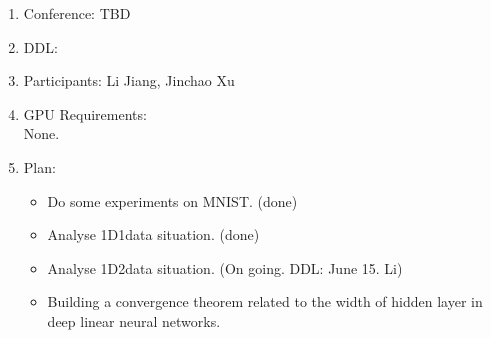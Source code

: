 \begin{enumerate}
    \item Conference: TBD
    \item DDL: 
	\item Participants:  Li Jiang, Jinchao Xu
	\item GPU Requirements: \\
	None.\\

	\item Plan:
	\begin{itemize}
		\item Do some experiments on MNIST. (done)
		\item Analyse 1D1data situation. (done)
		\item Analyse 1D2data situation. (On going. DDL: June 15. Li)
		\item Building a convergence theorem related to the width of hidden layer in deep linear neural networks.
	\end{itemize}
\end{enumerate}


